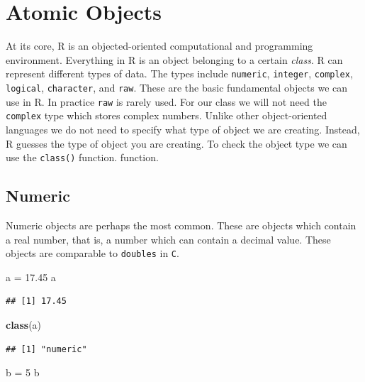 \documentclass[
]{book}
\newenvironment{Shaded}{\begin{snugshade}}{\end{snugshade}}
\newcommand{\DecValTok}[1]{\textcolor[rgb]{0.00,0.00,0.81}{#1}}
\newcommand{\FloatTok}[1]{\textcolor[rgb]{0.00,0.00,0.81}{#1}}
\newcommand{\KeywordTok}[1]{\textcolor[rgb]{0.13,0.29,0.53}{\textbf{#1}}}
\newcommand{\NormalTok}[1]{#1}
\newcommand{\StringTok}[1]{\textcolor[rgb]{0.31,0.60,0.02}{#1}}
\begin{document}
\hypertarget{atomic-objects}{%
\section{Atomic Objects}\label{atomic-objects}}

At its core, R is an objected-oriented computational and programming environment. Everything in R is an object belonging to a certain \emph{class}.
R can represent different types of data. The types include \texttt{numeric}, \texttt{integer}, \texttt{complex}, \texttt{logical}, \texttt{character}, and \texttt{raw}. These are the basic fundamental objects we can use in R. In practice \texttt{raw} is rarely used. For our class we will not need the \texttt{complex} type which stores complex numbers. Unlike other object-oriented languages we do not need to specify what type of object we are creating. Instead, R guesses the type of object you are creating. To check the object type we can use the \texttt{class()} function. function.

\hypertarget{numeric}{%
\subsection*{Numeric}\label{numeric}}

Numeric objects are perhaps the most common. These are objects which contain a real number, that is, a number which can contain a decimal value. These objects are comparable to \texttt{doubles} in \texttt{C}.

\begin{Shaded}
\begin{Highlighting}[]
\NormalTok{a =}\StringTok{ }\FloatTok{17.45}
\NormalTok{a}
\end{Highlighting}
\end{Shaded}

\begin{verbatim}
## [1] 17.45
\end{verbatim}

\begin{Shaded}
\begin{Highlighting}[]
\KeywordTok{class}\NormalTok{(a)}
\end{Highlighting}
\end{Shaded}

\begin{verbatim}
## [1] "numeric"
\end{verbatim}

\begin{Shaded}
\begin{Highlighting}[]
\NormalTok{b =}\StringTok{ }\DecValTok{5}
\NormalTok{b }
\end{Highlighting}
\end{Shaded}
\end{document}
